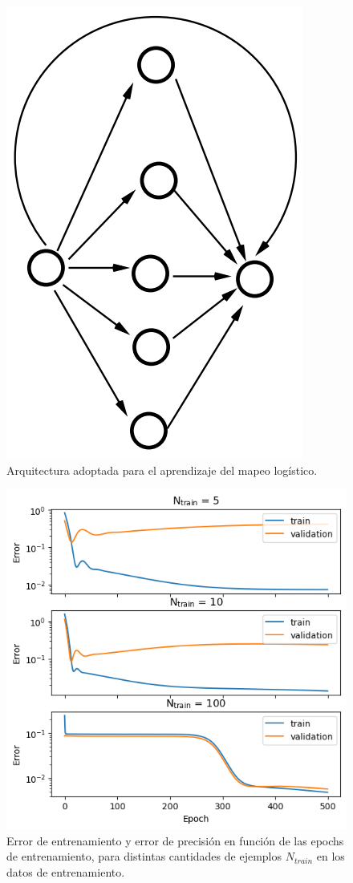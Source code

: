 \documentclass[aps,prb,twocolumn,superscriptaddress,floatfix,longbibliography]{revtex4-2}
\newcounter{para}
\begin{document}
\begin{figure}[h]
    \includegraphics[clip=true,width=0.55\columnwidth]{ej3_arquitectura.png}
    \caption{Arquitectura adoptada para el aprendizaje del mapeo logístico.}
        \label{fig:ej3_arquitectura}
\end{figure}


\begin{figure}[h]
    \includegraphics[clip=true,width=\columnwidth]{ej3_vs_epochs.png}
    \caption{Error de entrenamiento y error de precisión en función de las epochs de entrenamiento, para distintas cantidades de ejemplos \(N_{train}\) en los datos de entrenamiento.}
        \label{fig:ej3_error}
\end{figure}
\end{document}

